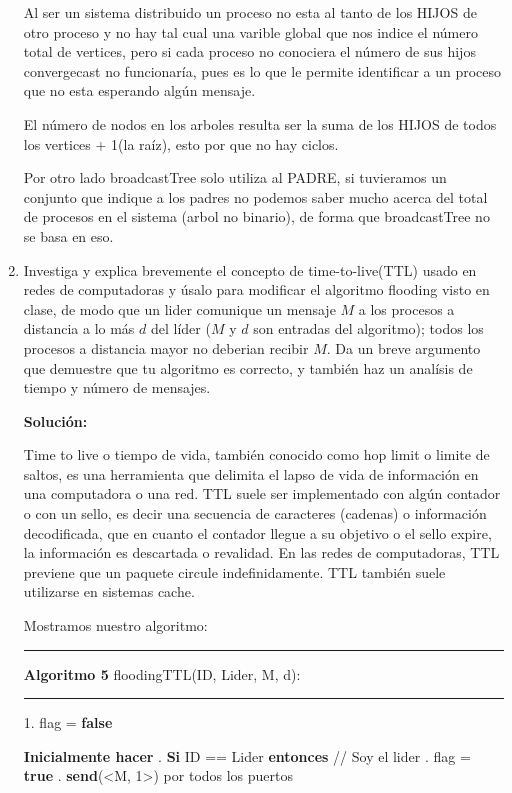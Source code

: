 \documentclass[8pt, letterpaper]{article}
\begin{document}
\begin{enumerate}
  Al ser un sistema distribuido un proceso no esta al tanto de los HIJOS de
  otro proceso y no hay tal cual una varible global que nos indice el número
  total de vertices, pero si cada proceso no conociera el número de sus
  hijos convergecast no funcionaría, pues es lo que le permite identificar
  a un proceso que no esta esperando algún mensaje.

  El número de nodos en los arboles resulta ser la suma de los HIJOS de todos
  los vertices + 1(la raíz), esto por que no hay ciclos.
  
  \hfill\break
  Por otro lado broadcastTree solo utiliza al PADRE, si tuvieramos un conjunto
  que indique a los padres no podemos saber mucho acerca del total de procesos
  en el sistema (arbol no binario), de forma que broadcastTree no se basa en
  eso.
  \hfill\break
  \rmfamily
\item Investiga y explica brevemente el concepto de time-to-live(TTL) usado en
  redes de computadoras y úsalo para modificar el algoritmo flooding visto en
  clase, de modo que un lider comunique un mensaje $M$ a los procesos a
  distancia a lo más $d$ del líder ($M$ y $d$ son entradas del algoritmo);
  todos los procesos a distancia mayor no deberian recibir $M$. Da un breve
  argumento que demuestre que tu algoritmo es correcto, y también haz un
  analísis de tiempo y número de mensajes.
  
  \hfill\break
  \ttfamily
  {\bf Solución:}

  Time to live o tiempo de vida, también conocido como hop limit o limite de
  saltos, es una herramienta que delimita el lapso de vida de información en
  una computadora o una red. TTL suele ser implementado con algún contador o
  con un sello, es decir una secuencia de caracteres (cadenas) o información
  decodificada, que en cuanto el contador llegue a su objetivo o el sello
  expire, la información es descartada o revalidad. En las redes de
  computadoras, TTL previene que un paquete circule indefinidamente.
  TTL también suele utilizarse en sistemas cache.

  \hfill\break
  Mostramos nuestro algoritmo:
  
  \rule{1\textwidth}{0.2mm}
  {\bf Algoritmo 5} floodingTTL(ID, Lider, M, d):
  \hfill\break
  \rule{1\textwidth}{0.2mm}
  1. flag = {\bf false}
  
  \hfill\break
  \hspace*{.2cm} {\bf Inicialmente hacer}
  \hfill{}. {\bf Si} ID == Lider {\bf entonces} // Soy el lider
  \hfill{}. \hspace{0.5cm} flag = {\bf true}
  \hfill{}. \hspace{0.5cm} {\bf send}(<M, 1>) por todos los puertos


\end{enumerate}
\end{document}
